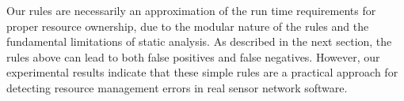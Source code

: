 Our rules are necessarily an approximation of the run time requirements for
proper resource ownership, due to the modular nature of the rules and the
fundamental limitations of static analysis.  
%
%
As described in the next section, the rules above can lead to both false
positives and false negatives.  
%
However, our experimental results indicate that these simple rules are a
practical approach for detecting resource management errors in real sensor
network software.


